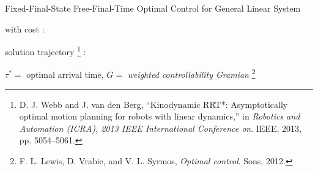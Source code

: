 \documentclass{beamer}
\begin{document}
\begin{frame}{Fixed-Final-State Free-Final-Time Optimal Control for General Linear System}

with cost :
\vskip 0.25cm

solution trajectory \footnote{D. J. Webb and J. van den Berg, “Kinodynamic RRT*: Asymptotically optimal
motion planning for robots with linear dynamics,” in \emph{Robotics and Automation
(ICRA), 2013 IEEE International Conference on}. IEEE, 2013, pp. 5054–5061.}  :

\vskip 0.25cm
\vskip 0.5cm
$\tau^{*} =$ optimal arrival time, $G =$ \emph{weighted controllability Gramian} \footnote{F. L. Lewis, D. Vrabie, and V. L. Syrmos, \emph{Optimal control}.
Sons, 2012.}

\end{frame}
\end{document}
